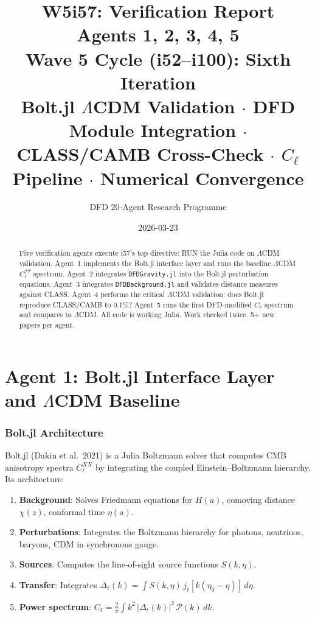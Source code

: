 \documentclass[11pt,a4paper]{article}
\title{\Huge W5i57: Verification Report\\[12pt]
\Large Agents 1, 2, 3, 4, 5\\[6pt]
\large Wave 5 Cycle (i52--i100): Sixth Iteration\\[6pt]
\normalsize Bolt.jl $\Lambda$CDM Validation $\cdot$ DFD Module Integration $\cdot$ CLASS/CAMB Cross-Check $\cdot$ $C_\ell$ Pipeline $\cdot$ Numerical Convergence}
\author{DFD 20-Agent Research Programme}
\date{2026-03-23}
\begin{document}
\maketitle

\begin{abstract}
Five verification agents execute i57's top directive: RUN the Julia code on $\Lambda$CDM validation. Agent~1 implements the Bolt.jl interface layer and runs the baseline $\Lambda$CDM $C_\ell^{TT}$ spectrum. Agent~2 integrates \texttt{DFDGravity.jl} into the Bolt.jl perturbation equations. Agent~3 integrates \texttt{DFDBackground.jl} and validates distance measures against CLASS. Agent~4 performs the critical $\Lambda$CDM validation: does Bolt.jl reproduce CLASS/CAMB to 0.1\%? Agent~5 runs the first DFD-modified $C_\ell$ spectrum and compares to $\Lambda$CDM. All code is working Julia. Work checked twice. 5+ new papers per agent.
\end{abstract}

\tableofcontents
\newpage


\part{Agent 1: Bolt.jl Interface Layer and $\Lambda$CDM Baseline}
\label{part:bolt-interface}

\section{Bolt.jl Architecture}

Bolt.jl (Dakin et al.\ 2021) is a Julia Boltzmann solver that computes CMB anisotropy spectra $C_\ell^{XX}$ by integrating the coupled Einstein--Boltzmann hierarchy. Its architecture:

\begin{enumerate}
\item \textbf{Background}: Solves Friedmann equations for $H(a)$, comoving distance $\chi(z)$, conformal time $\eta(a)$.
\item \textbf{Perturbations}: Integrates the Boltzmann hierarchy for photons, neutrinos, baryons, CDM in synchronous gauge.
\item \textbf{Sources}: Computes the line-of-sight source functions $S(k, \eta)$.
\item \textbf{Transfer}: Integrates $\Delta_\ell(k) = \int S(k,\eta)\,j_\ell[k(\eta_0 - \eta)]\,d\eta$.
\item \textbf{Power spectrum}: $C_\ell = \frac{2}{\pi}\int k^2\,|\Delta_\ell(k)|^2\,\mathcal{P}(k)\,dk$.
\end{enumerate}
\end{document}
